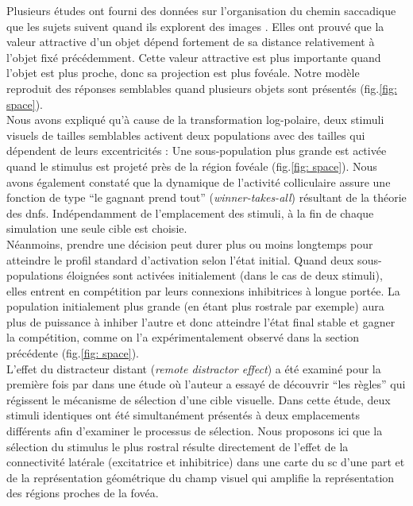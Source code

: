 Plusieurs études ont fourni des données sur l'organisation du chemin saccadique que les sujets suivent quand ils explorent des images \cite{Yarbus:1967, Noton:1971, Levy:1974}. Elles ont prouvé que la valeur attractive d'un objet dépend fortement de sa distance relativement à l'objet fixé précédemment. Cette valeur attractive est plus importante quand l'objet est plus proche, donc sa projection est plus fovéale. Notre modèle reproduit des réponses semblables quand plusieurs objets sont présentés (fig.\ref{fig: space}).\\

Nous avons expliqué qu'à cause de la transformation log-polaire, deux stimuli visuels de tailles semblables activent deux populations avec des tailles qui dépendent de leurs excentricités : Une sous-population plus grande est activée quand le stimulus est projeté près de la région fovéale (fig.\ref{fig: space}). Nous avons également constaté que la dynamique de l'activité colliculaire assure une fonction de type ``le gagnant prend tout'' (\textit{winner-takes-all}) résultant de la théorie des \glspl{dnf}. Indépendamment de l'emplacement des stimuli, à la fin de chaque simulation une seule cible est choisie.\\

Néanmoins, prendre une décision peut durer plus ou moins longtemps pour atteindre le profil standard d'activation selon l'état initial. Quand deux sous-populations éloignées sont activées initialement (dans le cas de deux stimuli), elles entrent en compétition par leurs connexions inhibitrices à longue portée. La population initialement plus grande (en étant plus rostrale par exemple) aura plus de puissance à inhiber l'autre et donc atteindre l'état final stable et gagner la compétition, comme on l'a expérimentalement observé dans la section précédente (fig.\ref{fig: space}).\\

L'effet du distracteur distant (\textit{remote distractor effect}) a été examiné pour la première fois par \cite{Levy-Schoen:1969} dans une étude où l'auteur a essayé de découvrir ``les règles'' qui régissent le mécanisme de sélection d'une cible visuelle. Dans cette étude, deux stimuli identiques ont été simultanément présentés à deux emplacements différents afin d'examiner le processus de sélection. Nous proposons ici que la sélection du stimulus le plus rostral résulte directement de l'effet de la connectivité latérale (excitatrice et inhibitrice) dans une carte du \gls{sc} d'une part et de la représentation géométrique du champ visuel qui amplifie la représentation des régions proches de la fovéa. 

